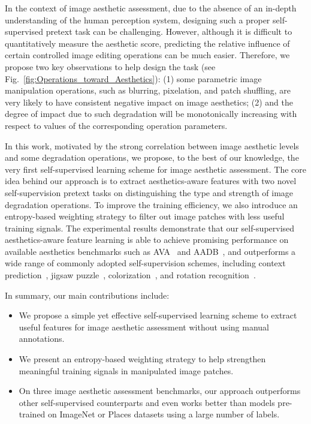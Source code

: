 \documentclass[letterpaper]{article}
\newcommand{\commentout}[1]{} %
\begin{document}
In the context of image aesthetic assessment, due to the absence of an in-depth understanding of the human perception system, designing such a proper self-supervised pretext task can be challenging. However, although it is difficult to quantitatively measure the aesthetic score, predicting the relative influence of certain controlled image editing operations can be much easier.
Therefore, we propose two key observations to help design the task (see Fig.~\ref{fig:Operations_toward_Aesthetics}): (1) some parametric image manipulation operations, such as blurring, pixelation, and patch shuffling, are very likely to have consistent negative impact on image aesthetics; (2) and the degree of impact due to such degradation will be monotonically increasing with respect to values of the corresponding operation parameters.

In this work, motivated by the strong correlation between image aesthetic levels and some degradation operations, we propose, to the best of our knowledge, the very first self-supervised learning scheme for image aesthetic assessment.
The core idea behind our approach is to extract aesthetics-aware features with two novel self-supervision pretext tasks on distinguishing the type and strength of image degradation operations.
To improve the training efficiency, we also introduce an entropy-based weighting strategy to filter out image patches with less useful training signals.
The experimental results demonstrate that our self-supervised aesthetics-aware feature learning is able to achieve promising performance on available aesthetics benchmarks such as AVA~\cite{murray2012ava} and AADB~\cite{kong2016photo}, and outperforms a wide range of commonly adopted self-supervision schemes, including context prediction~\cite{doersch2015unsupervised}, jigsaw puzzle~\cite{noroozi2016unsupervised}, colorization~\cite{larsson2017colorization,zhang2016colorful}, and rotation recognition~\cite{gidaris2018unsupervised}.

In summary, our main contributions include:
\begin{itemize}
\setlength{\itemsep}{0pt}
\setlength{\parskip}{0pt}
\setlength{\parsep}{0pt}
\item We propose a simple yet effective self-supervised learning scheme to extract useful features for image aesthetic assessment without using manual annotations.

\item We present an entropy-based weighting strategy to help strengthen meaningful training signals in manipulated image patches\commentout{ and promote training efficiency}.

\item On three image aesthetic assessment benchmarks, our approach outperforms other self-supervised counterparts and even works better than models pre-trained on ImageNet or Places datasets using a large number of labels.
\end{itemize}
\end{document}
